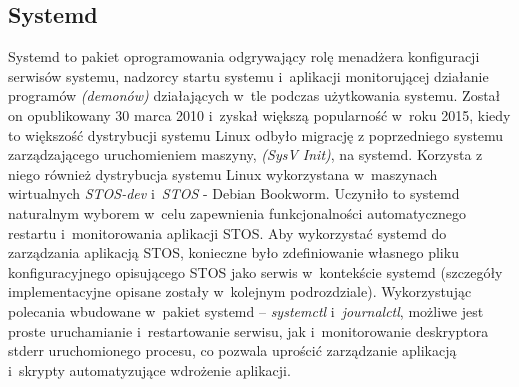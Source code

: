 \subsection{Systemd}
Systemd to pakiet oprogramowania odgrywający rolę menadżera konfiguracji serwisów systemu, nadzorcy startu systemu i~aplikacji monitorującej działanie programów \textit{(demonów)} działających w~tle podczas użytkowania systemu\cite{systemd}. Został on opublikowany 30 marca 2010 i~zyskał większą popularność w~roku 2015, kiedy to większość dystrybucji systemu Linux odbyło migrację z poprzedniego systemu zarządzającego uruchomieniem maszyny, \textit{(SysV Init)}, na systemd. Korzysta z niego również dystrybucja systemu Linux wykorzystana w~maszynach wirtualnych \textit{STOS-dev} i~\textit{STOS} - Debian Bookworm. Uczyniło to systemd naturalnym wyborem w~celu zapewnienia funkcjonalności automatycznego restartu i~monitorowania aplikacji STOS. 
\newline \noindent Aby wykorzystać systemd do zarządzania aplikacją STOS, konieczne było zdefiniowanie własnego pliku konfiguracyjnego opisującego STOS jako serwis w~kontekście systemd (szczegóły implementacyjne opisane zostały w~kolejnym podrozdziale)\cite{systemd-service}. Wykorzystując polecania wbudowane w~pakiet systemd -- \textit{systemctl} i~\textit{journalctl}, możliwe jest proste uruchamianie i~restartowanie serwisu, jak i~monitorowanie deskryptora stderr uruchomionego procesu, co pozwala uprościć zarządzanie aplikacją i~skrypty automatyzujące wdrożenie aplikacji.
